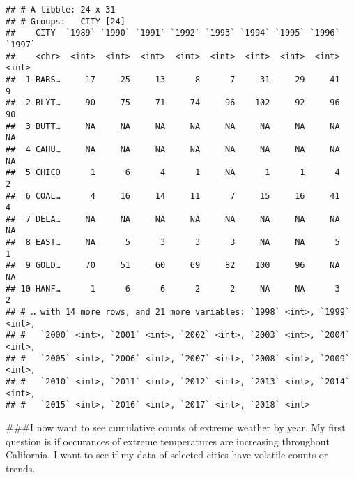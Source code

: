 \documentclass[]{article}
\newenvironment{Shaded}{\begin{snugshade}}{\end{snugshade}}
\newcommand{\DataTypeTok}[1]{\textcolor[rgb]{0.13,0.29,0.53}{#1}}
\newcommand{\DecValTok}[1]{\textcolor[rgb]{0.00,0.00,0.81}{#1}}
\newcommand{\KeywordTok}[1]{\textcolor[rgb]{0.13,0.29,0.53}{\textbf{#1}}}
\newcommand{\NormalTok}[1]{#1}
\newcommand{\OperatorTok}[1]{\textcolor[rgb]{0.81,0.36,0.00}{\textbf{#1}}}
\newcommand{\StringTok}[1]{\textcolor[rgb]{0.31,0.60,0.02}{#1}}
\begin{document}
\begin{verbatim}
## # A tibble: 24 x 31
## # Groups:   CITY [24]
##    CITY  `1989` `1990` `1991` `1992` `1993` `1994` `1995` `1996` `1997`
##    <chr>  <int>  <int>  <int>  <int>  <int>  <int>  <int>  <int>  <int>
##  1 BARS…     17     25     13      8      7     31     29     41      9
##  2 BLYT…     90     75     71     74     96    102     92     96     90
##  3 BUTT…     NA     NA     NA     NA     NA     NA     NA     NA     NA
##  4 CAHU…     NA     NA     NA     NA     NA     NA     NA     NA     NA
##  5 CHICO      1      6      4      1     NA      1      1      4      2
##  6 COAL…      4     16     14     11      7     15     16     41      4
##  7 DELA…     NA     NA     NA     NA     NA     NA     NA     NA     NA
##  8 EAST…     NA      5      3      3      3     NA     NA      5      1
##  9 GOLD…     70     51     60     69     82    100     96     NA     NA
## 10 HANF…      1      6      6      2      2     NA     NA      3      2
## # … with 14 more rows, and 21 more variables: `1998` <int>, `1999` <int>,
## #   `2000` <int>, `2001` <int>, `2002` <int>, `2003` <int>, `2004` <int>,
## #   `2005` <int>, `2006` <int>, `2007` <int>, `2008` <int>, `2009` <int>,
## #   `2010` <int>, `2011` <int>, `2012` <int>, `2013` <int>, `2014` <int>,
## #   `2015` <int>, `2016` <int>, `2017` <int>, `2018` <int>
\end{verbatim}

\#\#\#I now want to see cumulative counts of extreme weather by year. My
first question is if occurances of extreme temperatures are increasing
throughout California. I want to see if my data of selected cities have
volatile counts or trends.

\begin{Shaded}
\end{Shaded}
\end{document}
